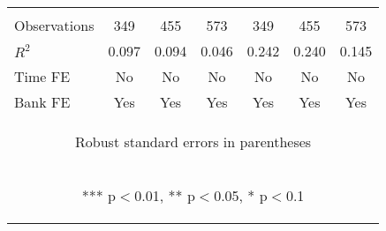 \documentclass[]{article}
\begin{document}
\begin{center}
\begin{tabular}{lcccccc}
\vspace{4pt} & \begin{footnotesize}\end{footnotesize} & \begin{footnotesize}\end{footnotesize} & \begin{footnotesize}\end{footnotesize} & \begin{footnotesize}\end{footnotesize} & \begin{footnotesize}\end{footnotesize} & \begin{footnotesize}\end{footnotesize} \\
Observations & 349 & 455 & 573 & 349 & 455 & 573 \\
$R^2$ & 0.097 & 0.094 & 0.046 & 0.242 & 0.240 & 0.145 \\
Time FE & No & No & No & No & No & No \\
 Bank FE & Yes & Yes & Yes & Yes & Yes & Yes \\ \hline
\multicolumn{7}{c}{\begin{footnotesize} Robust standard errors in parentheses\end{footnotesize}} \\
\multicolumn{7}{c}{\begin{footnotesize} *** p$<$0.01, ** p$<$0.05, * p$<$0.1\end{footnotesize}} \\
\end{tabular}
\end{center}
\end{document}
